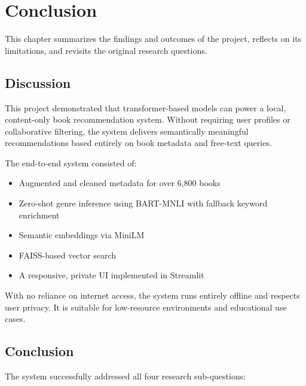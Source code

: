 \chapter{Conclusion}
\label{chapter:conclusion}

This chapter summarizes the findings and outcomes of the project, reflects on its limitations, and revisits the original research questions.

\section{Discussion}
\label{sec:discussion}

This project demonstrated that transformer-based models can power a local, content-only book recommendation system. Without requiring user profiles or collaborative filtering, the system delivers semantically meaningful recommendations based entirely on book metadata and free-text queries.

The end-to-end system consisted of:
\begin{itemize}
    \item Augmented and cleaned metadata for over 6,800 books
    \item Zero-shot genre inference using BART-MNLI with fallback keyword enrichment
    \item Semantic embeddings via MiniLM
    \item FAISS-based vector search
    \item A responsive, private UI implemented in Streamlit
\end{itemize}

With no reliance on internet access, the system runs entirely offline and respects user privacy. It is suitable for low-resource environments and educational use cases.

\section{Conclusion}
\label{sec:conclusion}

The system successfully addressed all four research sub-questions:

